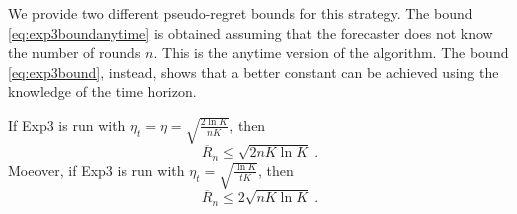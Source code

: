 \documentclass[11pt]{hackednow}
\newcommand{\oR}{\overline{R}}
\begin{document}
We provide two different pseudo-regret bounds for this strategy. The bound \eqref{eq:exp3boundanytime} is obtained assuming that the forecaster does not know the number of rounds $n$. This is the anytime version of the algorithm. The bound \eqref{eq:exp3bound}, instead, shows that a better constant can be achieved using the knowledge of the time horizon.
%
\begin{theorem} \label{th:Exp3}
If Exp3 is run with $\eta_t=\eta = \sqrt{\frac{2 \ln K}{n K}}$, then
\begin{equation} \label{eq:exp3bound}
\oR_n \leq \sqrt{2 n K \ln K}~.
\end{equation}
Moeover, if Exp3 is run with $\eta_t = \sqrt{\frac{\ln K}{t K}}$, then
\begin{equation} \label{eq:exp3boundanytime}
\oR_n \leq 2 \sqrt{n K \ln K}~.
\end{equation}
\end{theorem}
%
\end{document}
